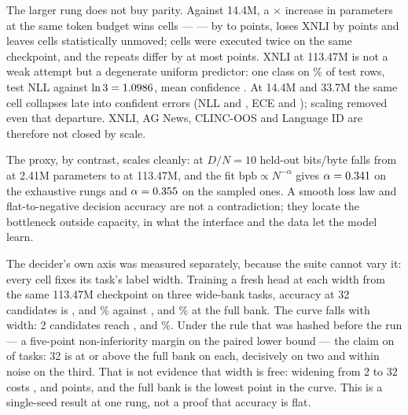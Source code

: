 The larger rung does not buy parity. Against 14.4M, a
\SuiteLargeParamsRatio$\times$ increase in parameters at the same token budget
wins \SuiteLargeWins{} cells --- \SuiteLargeWinCells{} --- by \SuiteLargeWinMin{}
to \SuiteLargeWinMax{} points, loses XNLI by \SuiteLargeLossAbs{} points and
leaves \SuiteLargeUnmoved{} cells statistically unmoved;
\SuiteReplicationCells{} cells were executed twice on the same checkpoint, and the
repeats differ by at most \SuiteReplicationMax{} points. XNLI at 113.47M
is not a weak attempt but a degenerate uniform predictor: one class on
\SuiteLargeXnliTopShare\% of test rows, test NLL \SuiteLargeXnliNll{} against
$\ln 3 = 1.0986$, mean confidence \SuiteLargeXnliConf. At 14.4M and
33.7M the same cell collapses late into confident errors (NLL
\SuiteSmallXnliNll{} and \SuiteMidXnliNll, ECE \SuiteSmallXnliEce{} and
\SuiteMidXnliEce); scaling removed even that departure. XNLI, AG News, CLINC-OOS
and Language ID are therefore not closed by scale.

The proxy, by contrast, scales cleanly: at $D/N = 10$ held-out bits/byte falls
from \IsoTinyExh{} at 2.41M parameters to \IsoLargeBpb{} at 113.47M, and the fit
$\mathrm{bpb} \propto N^{-\alpha}$ gives $\alpha = 0.341$ on the
\AlphaPoints{} exhaustive rungs and $\alpha = 0.355$ on the
\AlphaPointsSampled{} sampled ones. A smooth loss law and flat-to-negative
decision accuracy are not a contradiction; they locate the bottleneck outside
capacity, in what the interface and the data let the model learn.

The decider's own axis was measured separately, because the suite cannot vary it:
every cell fixes its task's label width. Training a fresh head at each width from
the same 113.47M checkpoint on three wide-bank tasks, accuracy at 32 candidates is
\EBankWThirtyTwo, \EClincWThirtyTwo{} and \EMassiveWThirtyTwo\% against \EBankWK, \EClincWK{} and
\EMassiveWK\% at the full bank. The curve falls with width: 2 candidates reach
\EBankWTwo, \EClincWTwo{} and \EMassiveWTwo\%. Under the rule that was hashed before
the run --- a five-point non-inferiority margin on the paired lower bound --- the
claim \EAggregateVerdict{} on \EHolds{} of \ETasks{} tasks: 32 is at or above the
full bank on each, decisively on two and within noise on the third. That is not evidence that width is
free: widening from 2 to 32 costs \EBankCostTwoToThirtyTwo, \EClincCostTwoToThirtyTwo{} and
\EMassiveCostTwoToThirtyTwo{} points, and the full bank is the lowest point in the curve.
This is a single-seed result at one rung, not a proof that accuracy is flat.

